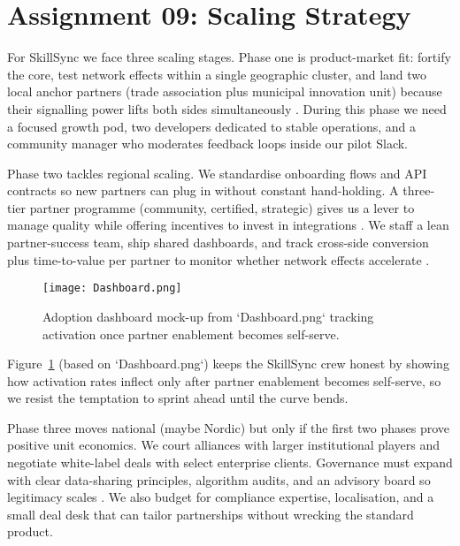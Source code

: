 \section*{Assignment 09: Scaling Strategy}

For SkillSync we face three scaling stages. Phase one is product-market fit: fortify the core, test network effects within a single geographic cluster, and land two local anchor partners (trade association plus municipal innovation unit) because their signalling power lifts both sides simultaneously \citep{Choudary2016,Reillier2017}. During this phase we need a focused growth pod, two developers dedicated to stable operations, and a community manager who moderates feedback loops inside our pilot Slack.

Phase two tackles regional scaling. We standardise onboarding flows and API contracts so new partners can plug in without constant hand-holding. A three-tier partner programme (community, certified, strategic) gives us a lever to manage quality while offering incentives to invest in integrations \citep{HagiuWright2013}. We staff a lean partner-success team, ship shared dashboards, and track cross-side conversion plus time-to-value per partner to monitor whether network effects accelerate \citep{ShapiroVarian1999}.

\begin{figure}[h]
  \centering
  \texttt{[image: Dashboard.png]}
  \caption{Adoption dashboard mock-up from `Dashboard.png` tracking activation once partner enablement becomes self-serve.}
  \label{fig:scaling-dashboard}
\end{figure}

Figure~\ref{fig:scaling-dashboard} (based on `Dashboard.png`) keeps the SkillSync crew honest by showing how activation rates inflect only after partner enablement becomes self-serve, so we resist the temptation to sprint ahead until the curve bends.

Phase three moves national (maybe Nordic) but only if the first two phases prove positive unit economics. We court alliances with larger institutional players and negotiate white-label deals with select enterprise clients. Governance must expand with clear data-sharing principles, algorithm audits, and an advisory board so legitimacy scales \citep{Srnicek2017,Zuboff2019}. We also budget for compliance expertise, localisation, and a small deal desk that can tailor partnerships without wrecking the standard product.

